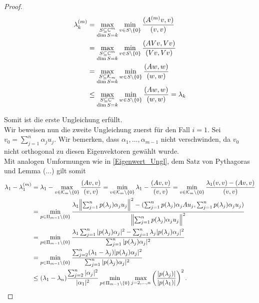 \documentclass{article}
\begin{document}
\begin{theorem}
\begin{proof}
	\begin{equation}
		\label{Eigenwert_Ungl}
		\begin{aligned}
			\lambda_k^{(m)} &= \max_{\substack{S \subseteq \mathbb{C}^m\\ \dim S = k}} \min_{v\in S\setminus\{0\}} \frac{(A^{(m)}v,v)}{(v,v)} \\
			&= \max_{\substack{S \subseteq \mathbb{C}^m\\ \dim S = k}} \min_{v\in S\setminus\{0\}} \frac{(AVv,Vv)}{(Vv,Vv)}\\
			&= \max_{\substack{S \subseteq \mathcal{K}_m\\ \dim S = k}} \min_{w\in S\setminus\{0\}} \frac{(Aw,w)}{(w,w)}\\
			 &\le \max_{\substack{S \subseteq \mathbb{C}^n\\ \dim S = k}} \min_{w\in S\setminus\{0\}} \frac{(Aw,w)}{(w,w)} = \lambda_k
		\end{aligned}
	\end{equation}

	Somit ist die erste Ungleichung erfüllt.\\

	Wir beweisen nun die zweite Ungleichung zuerst für den Fall $i = 1$.
	Sei $v_0 = \sum_{j=1}^{n}\alpha_j u_j$. Wir bemerken, dass $\alpha_1, \dots, \alpha_{m-1}$ nicht verschwinden, da $v_0$ nicht orthogonal zu diesen Eigenvektoren gewählt wurde.\\

	Mit analogen Umformungen wie in \ref{Eigenwert_Ungl}, dem Satz von Pythagoras und Lemma (...) gilt somit
	\begin{equation}
		\label{Ungl i=1}
		\begin{aligned}
			\lambda_1 - \lambda_1^{(m)} &= \lambda_1 - \max_{v \in \mathcal{K}_m \setminus\{0\}} \frac{(Av,v)}{(v,v)} = \min_{v \in \mathcal{K}_m\setminus\{0\}} \lambda_1 - \frac{(Av,v)}{(v,v)} = \min_{v \in \mathcal{K}_m\setminus\{0\}} \frac{\lambda_1(v,v) - (Av,v)}{(v,v)} \\ &= \min_{p\in \Pi_{m-1}\setminus \{0\}} \frac{\lambda_1 {\left \| \sum_{j=1}^{n}p(\lambda_j)\alpha_j u_j \right \|}_{}^2 - (\sum_{j=1}^{n}p(\lambda_j)\alpha_j A u_j,\sum_{j=1}^{n}p(\lambda_j)\alpha_j u_j)}{{\left \| \sum_{j=1}^{n}p(\lambda_j)\alpha_j u_j \right \|}_{}^2} \\
			&= \min_{p\in \Pi_{m-1}\setminus \{0\}} \frac{\lambda_1 \sum_{j=1}^{n} |p(\lambda_j)\alpha_j|^2 - \sum_{j=1}^{n} \lambda_j |p(\lambda_j)\alpha_j|^2 }{\sum_{j=1}^{n} |p(\lambda_j)\alpha_j|^2} \\
			&=  \min_{p\in \Pi_{m-1}\setminus \{0\}} \frac{\sum_{j=2}^{n} (\lambda_1 - \lambda_j)|p(\lambda_j)\alpha_j|^2}{\sum_{j=1}^{n} |p(\lambda_j)\alpha_j|^2} \\
			&\le (\lambda_1 - \lambda_n) \frac{\sum_{j=2}^{n} |\alpha_j|^2}{|\alpha_1|^2} \min_{p\in \Pi_{m-1}\setminus \{0\}} \max_{j=2,\dots,n} \left(\frac{|p(\lambda_j)|}{|p(\lambda_1)|}\right)^2.
		\end{aligned}
	\end{equation}


\end{proof}
\end{theorem}
\end{document}

